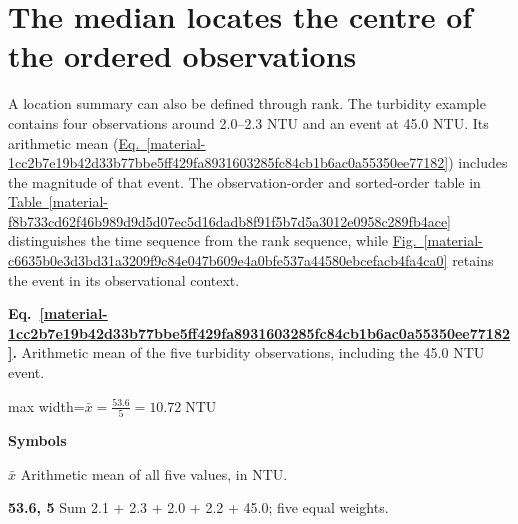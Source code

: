 \documentclass[11pt,a4paper]{article}
\begin{document}
\medskip

\clearpage
\section{The median locates the centre of the ordered observations}
A location summary can also be defined through rank. The turbidity example contains four observations around 2.0–2.3 NTU and an event at 45.0 NTU. Its arithmetic mean (\hyperref[material-1cc2b7e19b42d33b77bbe5ff429fa8931603285fc84cb1b6ac0a55350ee77182]{Eq.~\ref*{material-1cc2b7e19b42d33b77bbe5ff429fa8931603285fc84cb1b6ac0a55350ee77182}}) includes the magnitude of that event. The observation-order and sorted-order table in \hyperref[material-f8b733cd62f46b989d9d5d07ec5d16dadb8f91f5b7d5a3012e0958c289fb4ace]{Table~\ref*{material-f8b733cd62f46b989d9d5d07ec5d16dadb8f91f5b7d5a3012e0958c289fb4ace}} distinguishes the time sequence from the rank sequence, while \hyperref[material-c6635b0e3d3bd31a3209f9c84e047b609e4a0bfe537a44580ebcefacb4fa4ca0]{Fig.~\ref*{material-c6635b0e3d3bd31a3209f9c84e047b609e4a0bfe537a44580ebcefacb4fa4ca0}} retains the event in its observational context.


\par\medskip
\noindent\begin{minipage}{\linewidth}
\label{material-1cc2b7e19b42d33b77bbe5ff429fa8931603285fc84cb1b6ac0a55350ee77182}
\noindent\textbf{Eq.~\ref*{material-1cc2b7e19b42d33b77bbe5ff429fa8931603285fc84cb1b6ac0a55350ee77182}.} Arithmetic mean of the five turbidity observations, including the 45.0 NTU event.\par\nopagebreak
\begin{center}\begin{adjustbox}{max width=\linewidth}$\displaystyle \bar{x}=\frac{53.6}{5}=10.72\;\mathrm{NTU}$\end{adjustbox}\end{center}

\par\noindent\textbf{Symbols}

\par\noindent\textbf{\ensuremath{\bar{x}}} Arithmetic mean of all five values, in NTU.

\par\noindent\textbf{53.6, 5} Sum 2.1 + 2.3 + 2.0 + 2.2 + 45.0; five equal weights.

\end{minipage}\par
\medskip
\end{document}
